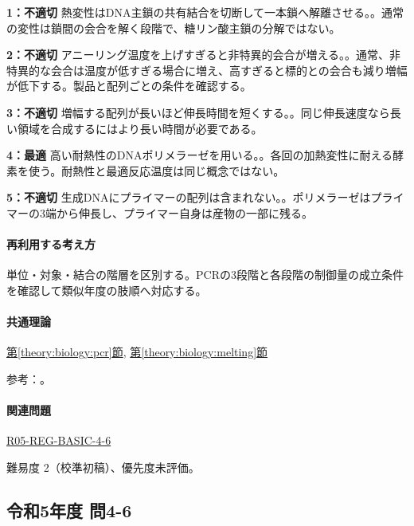 \noindent\textbf{1：不適切} 熱変性はDNA主鎖の共有結合を切断して一本鎖へ解離させる。。通常の変性は鎖間の会合を解く段階で、糖リン酸主鎖の分解ではない。\par

\noindent\textbf{2：不適切} アニーリング温度を上げすぎると非特異的会合が増える。。通常、非特異的な会合は温度が低すぎる場合に増え、高すぎると標的との会合も減り増幅が低下する。製品と配列ごとの条件を確認する。\par

\noindent\textbf{3：不適切} 増幅する配列が長いほど伸長時間を短くする。。同じ伸長速度なら長い領域を合成するにはより長い時間が必要である。\par

\noindent\textbf{4：最適} 高い耐熱性のDNAポリメラーゼを用いる。。各回の加熱変性に耐える酵素を使う。耐熱性と最適反応温度は同じ概念ではない。\par

\noindent\textbf{5：不適切} 生成DNAにプライマーの配列は含まれない。。ポリメラーゼはプライマーの3端から伸長し、プライマー自身は産物の一部に残る。\par

\paragraph{再利用する考え方} 単位・対象・結合の階層を区別する。PCRの3段階と各段階の制御量の成立条件を確認して類似年度の肢順へ対応する。

\paragraph{共通理論} \hyperref[theory:biology:pcr]{第\ref*{theory:biology:pcr}節}, \hyperref[theory:biology:melting]{第\ref*{theory:biology:melting}節}

\par 参考：\cite{neb_pcr}。

\paragraph{関連問題} \hyperref[q:r05-reg-basic-4-6]{R05-REG-BASIC-4-6}

\par 難易度 2（校準初稿）、優先度未評価。

\subsection{令和5年度 問4-6}
\label{q:r05-reg-basic-4-6}


